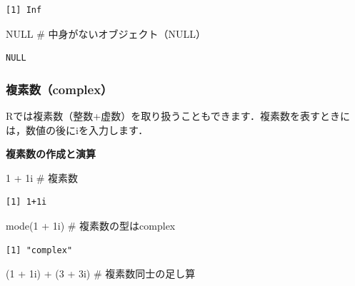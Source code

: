 \documentclass[
  letterpaper,
  DIV=11,
  numbers=noendperiod]{scrreprt}
\newenvironment{Shaded}{\begin{snugshade}}{\end{snugshade}}
\newcommand{\CommentTok}[1]{\textcolor[rgb]{0.37,0.37,0.37}{#1}}
\newcommand{\ConstantTok}[1]{\textcolor[rgb]{0.56,0.35,0.01}{#1}}
\newcommand{\DecValTok}[1]{\textcolor[rgb]{0.68,0.00,0.00}{#1}}
\newcommand{\FunctionTok}[1]{\textcolor[rgb]{0.28,0.35,0.67}{#1}}
\newcommand{\NormalTok}[1]{\textcolor[rgb]{0.00,0.23,0.31}{#1}}
\newcommand{\SpecialCharTok}[1]{\textcolor[rgb]{0.37,0.37,0.37}{#1}}
\begin{document}
\begin{verbatim}
[1] Inf
\end{verbatim}

\begin{Shaded}
\begin{Highlighting}[]
\ConstantTok{NULL} \CommentTok{\# 中身がないオブジェクト（NULL）}
\end{Highlighting}
\end{Shaded}

\begin{verbatim}
NULL
\end{verbatim}

\hypertarget{ux8907ux7d20ux6570complex}{%
\subsubsection{複素数（complex）}\label{ux8907ux7d20ux6570complex}}

Rでは複素数（整数+虚数）を取り扱うこともできます．複素数を表すときには，数値の後にiを入力します．

\textbf{複素数の作成と演算}

\begin{Shaded}
\begin{Highlighting}[]
\DecValTok{1} \SpecialCharTok{+}\NormalTok{ 1i }\CommentTok{\# 複素数}
\end{Highlighting}
\end{Shaded}

\begin{verbatim}
[1] 1+1i
\end{verbatim}

\begin{Shaded}
\begin{Highlighting}[]
\FunctionTok{mode}\NormalTok{(}\DecValTok{1} \SpecialCharTok{+}\NormalTok{ 1i) }\CommentTok{\# 複素数の型はcomplex}
\end{Highlighting}
\end{Shaded}

\begin{verbatim}
[1] "complex"
\end{verbatim}

\begin{Shaded}
\begin{Highlighting}[]
\NormalTok{(}\DecValTok{1} \SpecialCharTok{+}\NormalTok{ 1i) }\SpecialCharTok{+}\NormalTok{ (}\DecValTok{3} \SpecialCharTok{+}\NormalTok{ 3i) }\CommentTok{\# 複素数同士の足し算}
\end{Highlighting}
\end{Shaded}
\end{document}
